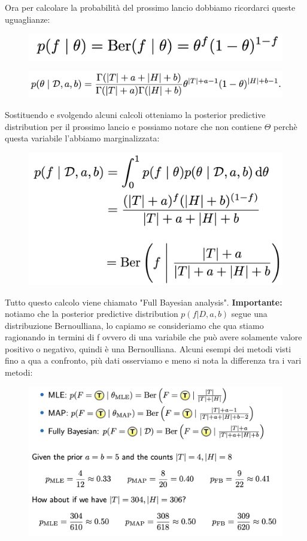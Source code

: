 \documentclass[14pt]{extreport}
\begin{document}
Ora per calcolare la probabilità del prossimo lancio dobbiamo ricordarci queste uguaglianze:

\begin{figure}[H]
	\centering
	\includegraphics[width=0.8\linewidth]{50.jpeg}
\end{figure}
\begin{figure}[H]
	\centering
	\includegraphics[width=0.8\linewidth]{51.jpeg}
\end{figure}

Sostituendo e svolgendo alcuni calcoli otteniamo la posterior predictive distribution per il prossimo lancio e possiamo notare che non contiene
$\Theta$ perchè questa variabile l'abbiamo marginalizzata:
\begin{figure}[H]
	\centering
	\includegraphics[width=0.6\linewidth]{52.jpeg}
\end{figure}

Tutto questo calcolo viene chiamato "Full Bayesian analysis". \textbf{Importante: }notiamo che la posterior predictive distribution $p(f|D,a,b)$ segue
una distribuzione Bernoulliana, lo capiamo se consideriamo che qua stiamo ragionando in termini di f ovvero di una variabile che può avere solamente
valore positivo o negativo, quindi è una Bernoulliana. Alcuni esempi dei metodi visti fino a qua a confronto, più dati osserviamo e meno si nota la
differenza tra i vari metodi:

\begin{figure}[H]
	\centering
	\includegraphics[width=0.7\linewidth]{53.jpeg}
\end{figure}
\end{document}
